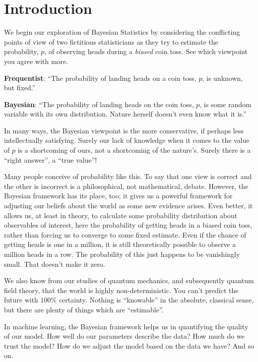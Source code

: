 \documentclass[]{article}
\begin{document}
\section{Introduction}
We begin our exploration of Bayesian Statistics by considering the conflicting points of view of two fictitious statisticians as they try to estimate the probability, $p$, of observing heads during a \textit{biased} coin toss. See which viewpoint you agree with more.

\textbf{Frequentist}: ``The probability of landing heads on a coin toss, $p$, is unknown, but fixed.''

\textbf{Bayesian}: ``The probability of landing heads on the coin toss, $p$, is some random variable with its own distribution. Nature herself doesn't even know what it is.''


In many ways, the Bayesian viewpoint is the more conservative, if perhaps less intellectually satisfying. Surely our lack of knowledge when it comes to the value of $p$ is a shortcoming of ours, not a shortcoming of the nature's. Surely there is a ``right answer'', a ``true value''!

Many people conceive of probability like this. To say that one view is correct and the other is incorrect is a philosophical, not mathematical, debate. However, the Bayesian framework has its place, too; it gives us a powerful framework for adjusting our beliefs about the world as some new evidence arises. Even better, it allows us, at least in theory, to calculate some probability distribution about observables of interest, here the probability of getting heads in a biased coin toss, rather than forcing us to converge to some fixed estimate. Even if the chance of getting heads is one in a million, it is still theoretically possible to observe a million heads in a row. The probability of this just happens to be vanishingly small. That doesn't make it zero.

We also know from our studies of quantum mechanics, and subsequently quantum field theory, that the world is highly non-deterministic. You can't predict the future with $100\%$ certainty. Nothing is ``knowable'' in the absolute, classical sense, but there are plenty of things which are ``estimable''.

In machine learning, the Bayesian framework helps us in quantifying the quality of our model. How well do our parameters describe the data? How much do we trust the model? How do we adjust the model based on the data we have? And so on.
\end{document}
